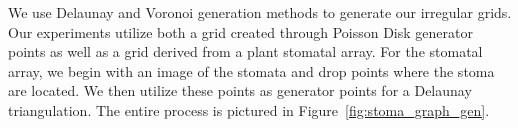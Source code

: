 \documentclass[a4paper,11pt]{article}
\begin{document}
We use Delaunay and Voronoi generation methods to generate our irregular grids. Our experiments utilize both a grid created through Poisson Disk generator points as well as a grid derived from a plant stomatal array. For the stomatal array, we begin with an image of the stomata and drop points where the stoma are located. We then utilize these points as generator points for a Delaunay triangulation. The entire process is pictured in Figure~\ref{fig:stoma_graph_gen}.

\end{document}
